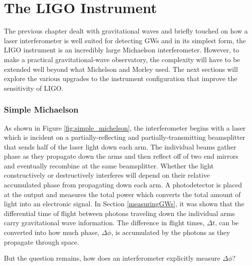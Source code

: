 	\chapter{The LIGO Instrument}\label{LIGOInstrument}
	The previous chapter dealt with gravitational waves and briefly touched on how a laser interferometer is well suited for detecting GWs and in its simplest form, the LIGO instrument is an incredibly large Michaelson interferometer. However, to make a practical gravitational-wave observatory, the complexity will have to be extended well beyond what Michelson and Morley used.  The next sections will explore the various upgrades to the instrument configuration that improve the sensitivity of LIGO.
	
		\subsection{Simple Michaelson}\label{michelson}
		As shown in Figure \ref{fig:simple_michelson}, the interferometer begins with a laser which is incident on a partially-reflecting and partially-transmitting beamsplitter that sends half of the laser light down each arm.  The individual beams gather phase as they propagate down the arms and then reflect off of two end mirrors and eventually recombine at the same beamsplitter.  Whether the light constructively or destructively interferes will depend on their relative accumulated phase from propagating down each arm. A photodetector is placed at the output and measures the total power which converts the total amount of light into an electronic signal.  In Section \ref{measuringGWs}, it was shown that the differential time of flight between photons traveling down the individual arms carry gravitational wave information.  
		The difference in flight times, $\Delta t$, can be converted into how much phase, $\Delta \phi$, is accumulated by the photons as they propagate through space.  
		
		But the question remains, how does an interferometer explicitly measure $\Delta \phi$?
		
